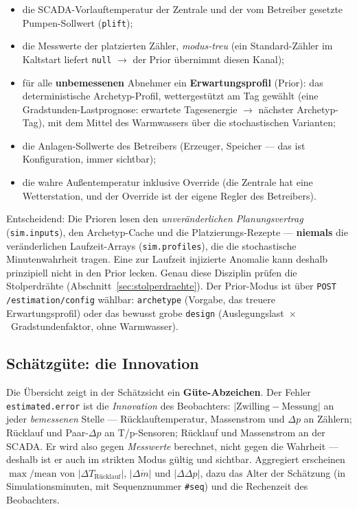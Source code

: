 \documentclass[11pt,a4paper,parskip=half]{scrreprt}
\newcommand{\api}[1]{\texttt{#1}}
\begin{document}
\begin{itemize}[nosep]
  \item die SCADA-Vorlauftemperatur der Zentrale und der vom Betreiber gesetzte
    Pumpen-Sollwert (\texttt{plift});
  \item die Messwerte der platzierten Zähler, \emph{modus-treu} (ein
    Standard-Zähler im Kaltstart liefert \texttt{null} $\rightarrow$ der Prior
    übernimmt diesen Kanal);
  \item für alle \textbf{unbemessenen} Abnehmer ein \textbf{Erwartungsprofil}
    (Prior): das deterministische Archetyp-Profil, wettergestützt am Tag
    gewählt (eine Gradstunden-Lastprognose: erwartete Tagesenergie
    $\rightarrow$ nächster Archetyp-Tag), mit dem Mittel des Warmwassers über
    die stochastischen Varianten;
  \item die Anlagen-Sollwerte des Betreibers (Erzeuger, Speicher --- das ist
    Konfiguration, immer sichtbar);
  \item die wahre Außentemperatur inklusive Override (die Zentrale hat eine
    Wetterstation, und der Override ist der eigene Regler des Betreibers).
\end{itemize}

Entscheidend: Die Prioren lesen den \emph{unveränderlichen Planungsvertrag}
(\texttt{sim.inputs}), den Archetyp-Cache und die Platzierungs-Rezepte ---
\textbf{niemals} die veränderlichen Laufzeit-Arrays (\texttt{sim.profiles}), die
die stochastische Minutenwahrheit tragen. Eine zur Laufzeit injizierte Anomalie
kann deshalb prinzipiell nicht in den Prior lecken. Genau diese Disziplin
prüfen die Stolperdrähte (Abschnitt~\ref{sec:stolperdraehte}). Der Prior-Modus
ist über \api{POST /estimation/config} wählbar: \texttt{archetype} (Vorgabe, das
treuere Erwartungsprofil) oder das bewusst grobe \texttt{design}
(Auslegungslast~$\times$~Gradstundenfaktor, ohne Warmwasser).

\subsection*{Schätzgüte: die Innovation}
\label{sec:schaetzguete}

Die Übersicht zeigt in der Schätzsicht ein \textbf{Güte-Abzeichen}. Der
Fehler \texttt{estimated.error} ist die \emph{Innovation} des Beobachters:
$|\text{Zwilling} - \text{Messung}|$ an jeder \emph{bemessenen} Stelle ---
Rücklauftemperatur, Massenstrom und $\Delta p$ an Zählern; Rücklauf und
Paar-$\Delta p$ an T/p-Sensoren; Rücklauf und Massenstrom an der SCADA. Er wird
also gegen \emph{Messwerte} berechnet, nicht gegen die Wahrheit --- deshalb ist
er auch im strikten Modus gültig und sichtbar. Aggregiert erscheinen
$\max/\text{mean}$ von $|\Delta T_\text{Rücklauf}|$, $|\Delta\dot m|$ und
$|\Delta\Delta p|$, dazu das Alter der Schätzung (in Simulationsminuten, mit
Sequenznummer \texttt{\#seq}) und die Rechenzeit des Beobachters.
\end{document}
